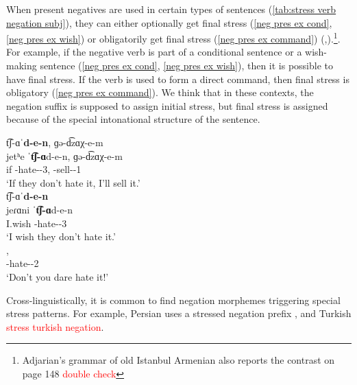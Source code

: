 When present negatives are used in certain types of sentences (\ref{tab:stress verb negation subj}), they can either optionally get final stress (\ref{neg pres ex cond}, \ref{neg pres ex wish}) or obligatorily get final stress (\ref{neg pres ex command}) (\citealt[67]{Avetisyan-2011-ComparativePhonoEastWest},\citealt[338]{Adjarian-1971-LiakatarPhono}).\footnote{Adjarian's grammar of old Istanbul Armenian also reports the contrast on page 148 \textcolor{red}{double check}}. For example, if the negative verb is part of a conditional sentence or a wish-making sentence  (\ref{neg pres ex cond}, \ref{neg pres ex wish}), then it is possible to have final stress. If the verb is used to form a direct command, then final stress is obligatory (\ref{neg pres ex command}). We think that in these contexts, the negation suffix is supposed to assign initial stress, but final stress is assigned because of the  special intonational structure of the sentence. 




\begin{exe}
	\ex \label{tab:stress verb negation subj}
	\begin{xlist}
		
		\ex {} {t͡ʃ-ɑˈ\textbf{d-e-n}}, {ɡə-d͡zɑχ-e-m} \\
		{jetʰe} {ˈ\textbf{t͡ʃ-ɑ}{d-e-n}}, {ɡə-d͡zɑχ-e-m}  \\
		if {\neggloss}-hate-{\thgloss}-3{\pl}, {\ind}-sell-{\thgloss}-1{\sg}
		\\
		\trans `If they don't hate it, I'll sell it.'\label{neg pres ex cond}
		\\ 
		\ex {} {t͡ʃ-ɑˈ\textbf{d-e-n}}  \\
		{jeɾɑni} {ˈ\textbf{t͡ʃ-ɑ}{d-e-n}}  \\
		I.wish {\neggloss}-hate-{\thgloss}-3{\pl}
		\\
		\trans `I wish they don't hate it.'\label{neg pres ex wish}
		\\ 
		\ex {}, \\
		{\neggloss}-hate-{\thgloss}-2{\sg}
		\\
		\trans `Don't you dare hate it!'\label{neg pres ex command}
		\\ 
	\end{xlist}
	
\end{exe}



Cross-linguistically, it is common to find negation morphemes triggering special stress patterns. For example, Persian uses a stressed negation prefix  \citep{Kahnemuyipour-2003-syntacticCategoriesStress}, and Turkish \textcolor{red}{stress turkish negation}.  

